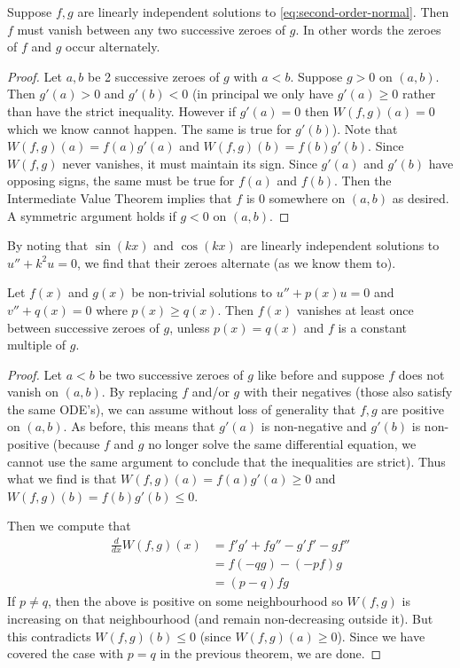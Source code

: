 \begin{theorem}
Suppose $f, g$ are linearly independent solutions to \eqref{eq:second-order-normal}. Then $f$ must vanish between any two successive zeroes of $g$. In other words the zeroes of $f$ and $g$ occur alternately.
\end{theorem}
\begin{proof}
Let $a, b$ be 2 successive zeroes of $g$ with $a < b$. Suppose $g > 0$ on $(a, b)$. Then $g'(a) > 0$ and $g'(b) < 0$ (in principal we only have $g'(a) \geq 0$ rather than have the strict inequality. However if $g'(a) = 0$ then $W(f, g)(a) = 0$ which we know cannot happen. The same is true for $g'(b)$). Note that $W(f, g)(a) = f(a) g'(a)$ and $W(f, g)(b) = f(b) g'(b)$. Since $W(f, g)$ never vanishes, it must maintain its sign. Since $g'(a)$ and $g'(b)$ have opposing signs, the same must be true for $f(a)$ and $f(b)$. Then the Intermediate Value Theorem implies that $f$ is 0 somewhere on $(a, b)$ as desired. A symmetric argument holds if $g < 0$ on $(a, b)$.
\end{proof}
\begin{remark}
By noting that $\sin (kx)$ and $\cos (kx)$ are linearly independent solutions to $u'' + k^2 u = 0$, we find that their zeroes alternate (as we know them to).
\end{remark}

\begin{theorem}
Let $f(x)$ and $g(x)$ be non-trivial solutions to $u'' + p(x) u = 0$ and $v'' + q(x) = 0$ where $p(x) \geq q(x)$. Then $f(x)$ vanishes at least once between successive zeroes of $g$, unless $p(x) = q(x)$ and $f$ is a constant multiple of $g$.
\end{theorem}
\begin{proof}
Let $a < b$ be two successive zeroes of $g$ like before and suppose $f$ does not vanish on $(a, b)$. By replacing $f$ and/or $g$ with their negatives (those also satisfy the same ODE's), we can assume without loss of generality that $f, g$ are positive on $(a, b)$. As before, this means that $g'(a)$ is non-negative and $g'(b)$ is non-positive (because $f$ and $g$ no longer solve the same differential equation, we cannot use the same argument to conclude that the inequalities are strict). Thus what we find is that $W(f, g)(a) = f(a) g'(a) \geq 0$ and $W(f, g)(b) = f(b) g'(b) \leq 0$.

Then we compute that 
\begin{align*}
    \frac{d}{dx} W(f, g)(x) &= f' g' + f g'' - g' f' - g f''\\
    &= f(-qg) - (-pf)g\\
    &= (p - q) fg
\end{align*}
If $p \neq q$, then the above is positive on some neighbourhood so $W(f, g)$ is increasing on that neighbourhood (and remain non-decreasing outside it). But this contradicts $W(f, g)(b) \leq 0$ (since $W(f, g)(a) \geq 0$). Since we have covered the case with $p = q$ in the previous theorem, we are done. 
\end{proof}



